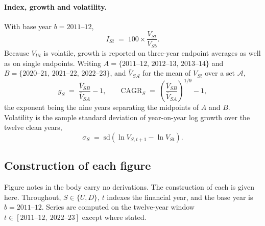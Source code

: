 \paragraph{Index, growth and volatility.} With base year $b = 2011\text{--}12$,
\begin{equation}
    I_{St} \;=\; 100 \times \frac{V_{St}}{V_{Sb}} .
    \label{eq:index}
\end{equation}
Because $V_{Ut}$ is volatile, growth is reported on three-year endpoint averages
as well as on single endpoints. Writing $A = \{2011\text{--}12,\,2012\text{--}13,\,2013\text{--}14\}$
and $B = \{2020\text{--}21,\,2021\text{--}22,\,2022\text{--}23\}$, and $\bar V_{S\mathcal{A}}$
for the mean of $V_{St}$ over a set $\mathcal{A}$,
\begin{equation}
    g_S \;=\; \frac{\bar V_{SB}}{\bar V_{SA}} - 1,
    \qquad
    \mathrm{CAGR}_S \;=\; \left( \frac{\bar V_{SB}}{\bar V_{SA}} \right)^{1/9} - 1 ,
    \label{eq:growth}
\end{equation}
the exponent being the nine years separating the midpoints of $A$ and $B$.
Volatility is the sample standard deviation of year-on-year log growth over the
twelve clean years,
\begin{equation}
    \sigma_S \;=\; \mathrm{sd}\!\left( \ln V_{S,t+1} - \ln V_{St} \right) .
    \label{eq:vol}
\end{equation}

\subsection{Construction of each figure}
\label{app:asi_figures}

Figure notes in the body carry no derivations. The construction of each is given
here. Throughout, $S \in \{U, D\}$, $t$ indexes the financial year, and the base
year is $b = 2011\text{--}12$. Series are computed on the twelve-year window
$t \in [2011\text{--}12,\ 2022\text{--}23]$ except where stated.

